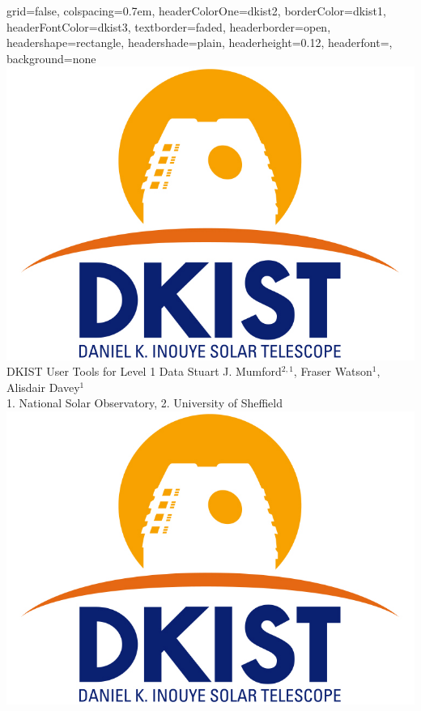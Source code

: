 \documentclass[landscape,a0paper,fontscale=0.32]{baposter}
\begin{document}
\begin{poster}{
 grid=false,
 colspacing=0.7em,
 headerColorOne=dkist2,
 borderColor=dkist1,
 headerFontColor=dkist3,
 textborder=faded,
 headerborder=open,
 headershape=rectangle,
 headershade=plain,
 headerheight=0.12\textheight,
 headerfont={\bfseries},
 background=none
 }
 {
   \includegraphics[height=0.08\textheight]{dkistlogo.jpg}
 }
 {\sc\Huge DKIST User Tools for Level 1 Data}
 {Stuart J. Mumford$^{2,1}$, Fraser Watson$^{1}$, Alisdair Davey$^{1}$\\
 {\footnotesize{1. National Solar Observatory, 2. University of Sheffield}}}
 {
 \includegraphics[height=0.08\textheight]{dkistlogo.jpg}
 }
 


\end{poster}
\end{document}
